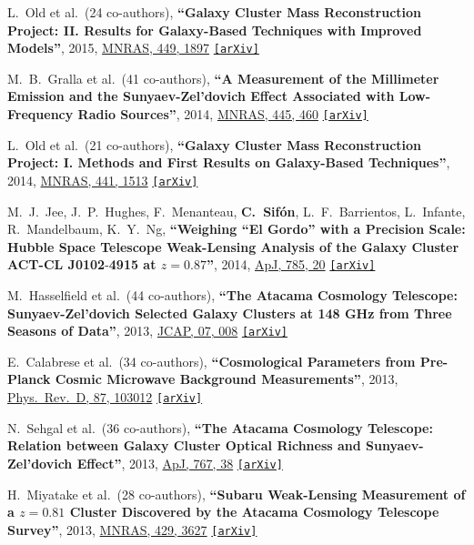 \documentclass{article}
\def\apj{ApJ}
\def\jcap{JCAP}
\def\mnras{MNRAS}
\def\prd{Phys.\ Rev.\ D}
\newcommand{\myself}{\textbf{\color{red} C.~Sif\'on}}
\newcommand{\etal}[1]{et al.\ (#1 co-authors),}
\newcommand{\paper}[1]{\textbf{``#1''}}
\newcommand{\arxiv}[1]
    {\href{https://arxiv.org/abs/#1}{\texttt{\color{magenta}[arXiv]}}}
\begin{document}
\begin{etaremune}
\item
L.~Old \etal{24}
\paper{Galaxy Cluster Mass Reconstruction Project: II. Results for Galaxy-Based Techniques with Improved Models},
2015, \href{http://adsabs.harvard.edu/abs/2015MNRAS.449.1897O}{\mnras, 449, 1897}
\arxiv{1502.07347}

\item
M.~B.~Gralla \etal{41}
\paper{A Measurement of the Millimeter Emission and the Sunyaev-Zel'dovich Effect Associated with Low-Frequency Radio Sources},
2014, \href{http://adsabs.harvard.edu/abs/2014MNRAS.445..460G}{\mnras, 445, 460}
\arxiv{1310.8281}

\item
L.~Old \etal{21}
\paper{Galaxy Cluster Mass Reconstruction Project: I. Methods and First Results on Galaxy-Based Techniques},
2014, \href{http://adsabs.harvard.edu/abs/2014MNRAS.441.1513O}{\mnras, 441, 1513}
\arxiv{1403.4610}

\item
M.~J.~Jee, J.~P.~Hughes, F.~Menanteau, \myself, L.~F.~Barrientos, L.~Infante, 
R.~Mandelbaum, K.~Y.~Ng,
\paper{Weighing ``El Gordo'' with a Precision Scale: Hubble Space Telescope Weak-Lensing Analysis of the Galaxy Cluster ACT-CL J0102$\textbf{-}$4915 at $z=0.87$},
2014, \href{http://adsabs.harvard.edu/abs/2014ApJ...785...20J}{\apj, 785, 20}
\arxiv{1309.5097}

\item
M.~Hasselfield \etal{44}
\paper{The Atacama Cosmology Telescope: Sunyaev-Zel'dovich Selected Galaxy Clusters at 148 GHz from Three Seasons of Data},
2013, \href{http://adsabs.harvard.edu/abs/2013JCAP...07..008H}{\jcap, 07, 008}
\arxiv{1301.0816}

\item
E.~Calabrese \etal{34}
\paper{Cosmological Parameters from Pre-Planck Cosmic Microwave Background Measurements},
2013, \href{http://adsabs.harvard.edu/abs/2013PhRvD..87j3012C}{\prd, 87, 103012}
\arxiv{1302.1841}

\item
N.~Sehgal \etal{36}
\paper{The Atacama Cosmology Telescope: Relation between Galaxy Cluster Optical Richness and Sunyaev-Zel'dovich Effect},
2013, \href{http://adsabs.harvard.edu/abs/2013ApJ...767...38S}{\apj, 767, 38}
\arxiv{1205.2369}

\item
H.~Miyatake \etal{28}
\paper{Subaru Weak-Lensing Measurement of a $z=0.81$ Cluster Discovered by the Atacama Cosmology Telescope Survey},
2013, \href{http://adsabs.harvard.edu/abs/2013MNRAS.429.3627M}{\mnras, 429, 3627}
\arxiv{1209.4643}


\end{etaremune}
\end{document}
